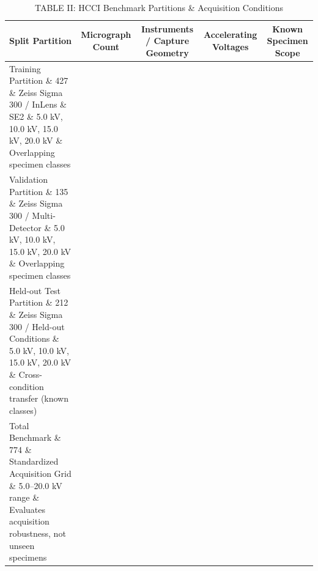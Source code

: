 \begin{table}[t]
\centering
\caption{TABLE II: HCCI Benchmark Partitions & Acquisition Conditions}
\label{tab:table2_dataset_splits}
\begin{tabular}{lcccc}
\hline
\textbf{Split Partition} & \textbf{Micrograph Count} & \textbf{Instruments / Capture Geometry} & \textbf{Accelerating Voltages} & \textbf{Known Specimen Scope} \\
\hline
Training Partition \& 427 \& Zeiss Sigma 300 / InLens \& SE2 \& 5.0 kV, 10.0 kV, 15.0 kV, 20.0 kV \& Overlapping specimen classes \\
Validation Partition \& 135 \& Zeiss Sigma 300 / Multi-Detector \& 5.0 kV, 10.0 kV, 15.0 kV, 20.0 kV \& Overlapping specimen classes \\
Held-out Test Partition \& 212 \& Zeiss Sigma 300 / Held-out Conditions \& 5.0 kV, 10.0 kV, 15.0 kV, 20.0 kV \& Cross-condition transfer (known classes) \\
Total Benchmark \& 774 \& Standardized Acquisition Grid \& 5.0–20.0 kV range \& Evaluates acquisition robustness, not unseen specimens \\
\hline
\end{tabular}
\end{table}
